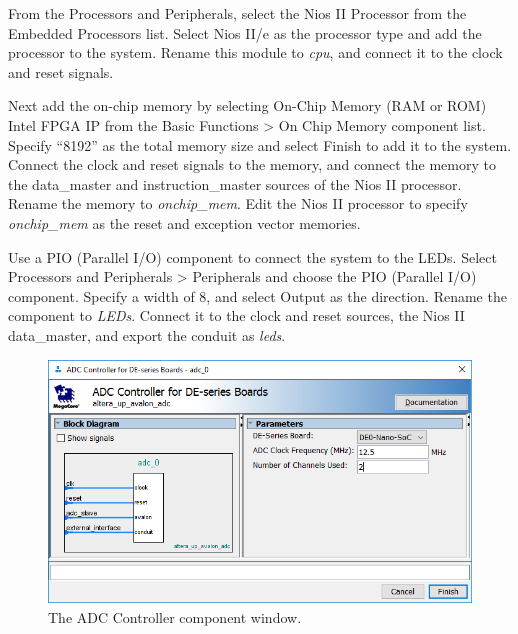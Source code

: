\documentclass[11pt, twoside, pdftex]{article}
\begin{document}
From the {\sf Processors and Peripherals}, select the {\sf Nios II Processor} from the {\sf Embedded Processors} list. Select {\sf Nios II/e} as the processor type and add the processor to the system. Rename this module to {\it cpu}, and connect it to the clock and reset signals.

Next add the on-chip memory by selecting {\sf On-Chip Memory (RAM or ROM) Intel FPGA IP} from the {\sf Basic Functions > On Chip Memory} component list. Specify ``8192'' as the total memory size and select {\sf Finish} to add it to the system. Connect the clock and reset signals to the memory, and connect the memory to the data\_master and instruction\_master sources of the Nios II processor. Rename the memory to {\it onchip\_mem}. Edit the Nios II processor to specify {\it onchip\_mem} as the reset and exception vector memories.

Use a {\sf PIO (Parallel I/O)} component to connect the system to the LEDs. Select {\sf Processors and Peripherals > Peripherals} and choose  the {\sf PIO (Parallel I/O)} component. Specify a width of 8, and select Output as the direction. Rename the component to {\it LEDs}. Connect it to the clock and reset sources, the Nios II data\_master, and export the conduit as {\it leds}.\\
\begin {figure} [H]
\begin {center}
\includegraphics [scale = 0.7] {figures/adc_comp.png}
\end {center}
\caption {The ADC Controller component window.}
\label {fig:adc_comp}
\end {figure}
\end{document}
